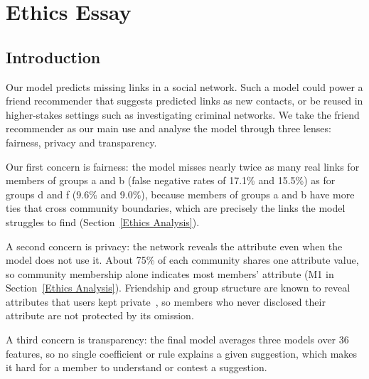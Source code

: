 \documentclass[runningheads]{llncs}
\begin{document}
\newpage
\section{Ethics Essay}

\subsection{Introduction}
\label{Ethics Introduction}

Our model predicts missing links in a social network. Such a model could power a friend recommender that suggests predicted links as new contacts, or be reused in higher-stakes settings such as investigating criminal networks. We take the friend recommender as our main use and analyse the model through three lenses: fairness, privacy and transparency.

Our first concern is fairness: the model misses nearly twice as many real links for members of groups a and b (false negative rates of 17.1\% and 15.5\%) as for groups d and f (9.6\% and 9.0\%), because members of groups a and b have more ties that cross community boundaries, which are precisely the links the model struggles to find (Section~\ref{Ethics Analysis}).

A second concern is privacy: the network reveals the attribute even when the model does not use it. About 75\% of each community shares one attribute value, so community membership alone indicates most members' attribute (M1 in Section~\ref{Ethics Analysis}). Friendship and group structure are known to reveal attributes that users kept private~\cite{zheleva_join_2009}, so members who never disclosed their attribute are not protected by its omission.

A third concern is transparency: the final model averages three models over 36 features, so no single coefficient or rule explains a given suggestion, which makes it hard for a member to understand or contest a suggestion.
\end{document}
